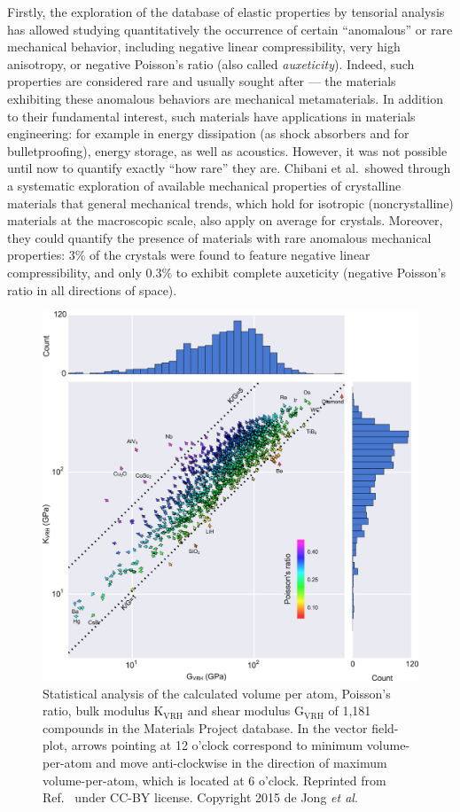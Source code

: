 \documentclass[main.tex]{subfiles}
\begin{document}
Firstly, the exploration of the database of elastic properties by tensorial analysis has allowed studying quantitatively the occurrence of certain ``anomalous'' or rare mechanical behavior, including negative linear compressibility, very high anisotropy, or negative Poisson's ratio (also called \emph{auxeticity}). Indeed, such properties are considered rare and usually sought after --- the materials exhibiting these anomalous behaviors are mechanical metamaterials.\cite{Coudert_2019} {In addition to their fundamental interest, such materials have applications in materials engineering: for example in energy dissipation (as shock absorbers and for bulletproofing), energy storage, as well as acoustics.\cite{Surjadi_2018}} However, it was not possible until now to quantify exactly ``how rare'' they are. Chibani et al.\ showed through a systematic exploration of available mechanical properties of crystalline materials that general mechanical trends, which hold for isotropic (noncrystalline) materials at the macroscopic scale, also apply on average for crystals. Moreover, they could quantify the presence of materials with rare anomalous mechanical properties: {3\%} of the crystals were found to feature negative linear compressibility, and only {0.3\%} to exhibit complete auxeticity (negative Poisson's ratio in all directions of space).

\begin{figure}[ht]
\centering
  \includegraphics[width=0.8\linewidth]{figures/1-screening/deJong2015.jpeg}
  \caption{Statistical analysis of the calculated volume per atom, Poisson's ratio, bulk modulus {$\mathrm{K_{VRH}}$} and shear modulus {$\mathrm{G_{VRH}}$ of} 1,181 compounds in the Materials Project database. In the vector field-plot, arrows pointing at 12 o'clock correspond to minimum volume-per-atom and move anti-clockwise in the direction of maximum volume-per-atom, which is located at 6 o'clock. Reprinted from Ref.~ under CC-BY license. Copyright 2015 de Jong \emph{et al}.}
  \label{fgr:deJong2015}
\end{figure}
\end{document}
